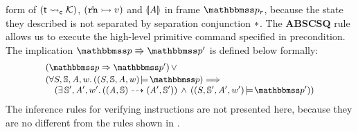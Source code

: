 form of $({\textsf{t}} \leadsto_{\textsf{c}} {\mathcal{K}})$, 
$({\hat{\texttt{rn}}} \rightarrowtail {v})$ and $\llparenthesis {\textit{A}} \rrparenthesis$ 
in frame $\relastP_r$, 
because the state they described is not separated by 
separation conjunction $*$. 
The \textbf{ABSCSQ} rule allows us to execute the high-level 
primitive command specified in precondition. 
The implication $\absExec{\relastP}{\relastP'}$ 
is defined below formally: 
\[
    \small
    \begin{array}{l}
        (\relastP \Rightarrow \relastP') \, \lor \\
        \\[-9.5pt]
        (
            \forall \state, \hpstate, \primcom, \word. \, 
            (\asrtmodel{(\state, \hpstate, \primcom, \word)}
                {\relastP}) \Longrightarrow \\
            \quad
            (\exists \, \hpstate', \primcom', \word'. \, 
            (\primTrans{(\primcom, \hpstate)}
        	{(\primcom', \hpstate')})
            \, \land \, 
            (\asrtmodel{(\state, \hpstate', \primcom', \word')}{\relastP'}))
    \end{array}
\]
The inference rules for verifying instructions are not 
presented here, because they are no different from 
the rules shown in \Fig{\ref{fig:Seleted Inference rules}}. 
        
